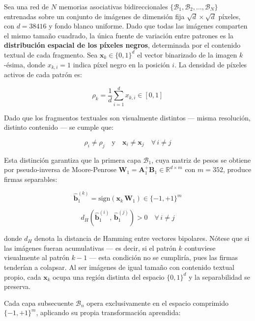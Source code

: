 \documentclass[12pt]{article}
\begin{document}
Sea una red de $N$ memorias asociativas bidireccionales $\{\mathcal{B}_1, \mathcal{B}_2, \dots, \mathcal{B}_N\}$
entrenadas sobre un conjunto de imágenes de dimensión fija $\sqrt{d} \times \sqrt{d}$ píxeles,
con $d = 38416$ y fondo blanco uniforme. Dado que todas las imágenes comparten el mismo tamaño
cuadrado, la única fuente de variación entre patrones es la \textbf{distribución espacial de los
	píxeles negros}, determinada por el contenido textual de cada fragmento. Sea $\mathbf{x}_k \in \{0,1\}^{d}$
el vector binarizado de la imagen $k$-ésima, donde $x_{k,i} = 1$ indica píxel negro en la posición $i$.
La densidad de píxeles activos de cada patrón es:

\begin{equation}
	\rho_k = \frac{1}{d} \sum_{i=1}^{d} x_{k,i} \in [0, 1]
\end{equation}

Dado que los fragmentos textuales son visualmente distintos — misma resolución, distinto contenido —
se cumple que:

\begin{equation}
	\rho_i \neq \rho_j \quad \text{y} \quad
	\mathbf{x}_i \neq \mathbf{x}_j \quad \forall\, i \neq j
\end{equation}

Esta distinción garantiza que la primera capa $\mathcal{B}_1$, cuya matriz de pesos se obtiene por
pseudo-inversa de Moore-Penrose $\mathbf{W}_1 = \mathbf{A}_1^{+} \mathbf{B}_1 \in \mathbb{R}^{d \times m}$
con $m = 352$, produce firmas separables:

\begin{equation}
	\hat{\mathbf{b}}_1^{(k)} = \text{sign}\!\left(\mathbf{x}_k \, \mathbf{W}_1\right)
	\in \{-1, +1\}^{m}
\end{equation}

\begin{equation}
	d_H\!\left(\hat{\mathbf{b}}_1^{(i)},\, \hat{\mathbf{b}}_1^{(j)}\right) > 0
	\quad \forall\, i \neq j
\end{equation}

donde $d_H$ denota la distancia de Hamming entre vectores bipolares. Nótese que si las imágenes
fueran acumulativas — es decir, si el patrón $k$ contuviese visualmente al patrón $k-1$ — esta
condición no se cumpliría, pues las firmas tenderían a colapsar. Al ser imágenes de igual tamaño
con contenido textual propio, cada $\mathbf{x}_k$ ocupa una región distinta del espacio $\{0,1\}^d$
y la separabilidad se preserva.

Cada capa subsecuente $\mathcal{B}_n$ opera exclusivamente en el espacio comprimido
$\{-1,+1\}^m$, aplicando su propia transformación aprendida:
\end{document}
